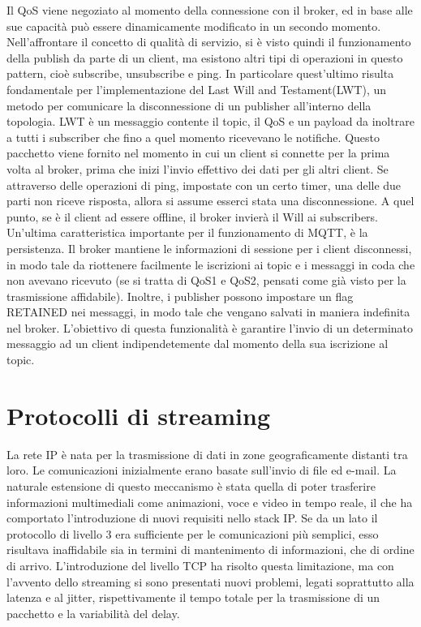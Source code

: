 Il QoS viene negoziato al momento della connessione con il broker, ed in base alle sue capacità può essere dinamicamente modificato in un secondo momento. Nell'affrontare il concetto di qualità di servizio, si è visto quindi il funzionamento della publish da parte di un client, ma esistono altri tipi di operazioni in questo pattern, cioè subscribe, unsubscribe e ping. In particolare quest'ultimo risulta fondamentale per l'implementazione del Last Will and Testament(LWT), un metodo per comunicare la disconnessione di un publisher all'interno della topologia. LWT è un messaggio contente il topic, il QoS e un payload da inoltrare a tutti i subscriber che fino a quel momento ricevevano le notifiche. Questo pacchetto viene fornito nel momento in cui un client si connette per la prima volta al broker, prima che inizi l'invio effettivo dei dati per gli altri client. Se attraverso delle operazioni di ping, impostate con un certo timer, una delle due parti non riceve risposta, allora si assume esserci stata una disconnessione. A quel punto, se è il client ad essere offline, il broker invierà il Will ai subscribers. Un'ultima caratteristica importante per il funzionamento di MQTT, è la persistenza. Il broker mantiene le informazioni di sessione per i client disconnessi, in modo tale da riottenere facilmente le iscrizioni ai topic e i messaggi in coda che non avevano ricevuto (se si tratta di QoS1 e QoS2, pensati come già visto per la trasmissione affidabile). Inoltre, i publisher possono impostare un flag RETAINED nei messaggi, in modo tale che vengano salvati in maniera indefinita nel broker. L'obiettivo di questa funzionalità è garantire l'invio di un determinato messaggio ad un client indipendetemente dal momento della sua iscrizione al topic.  

\section{Protocolli di streaming}
La rete IP è nata per la trasmissione di dati in zone geograficamente distanti tra loro. Le comunicazioni inizialmente erano basate sull'invio di file ed e-mail. La naturale estensione di questo meccanismo è stata quella di poter trasferire informazioni multimediali come animazioni, voce e video in tempo reale, il che ha comportato l'introduzione di nuovi requisiti nello stack IP. Se da un lato il protocollo di livello 3 era sufficiente per le comunicazioni più semplici, esso risultava inaffidabile sia in termini di mantenimento di informazioni, che di ordine di arrivo. L'introduzione del livello TCP ha risolto questa limitazione, ma con l'avvento dello streaming si sono presentati nuovi problemi, legati soprattutto alla latenza e al jitter, rispettivamente il tempo totale per la trasmissione di un pacchetto e la variabilità del delay. 

